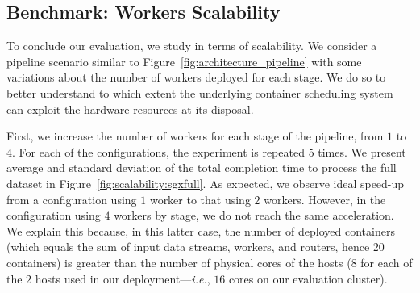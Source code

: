 




\subsection{Benchmark: Workers Scalability}
To conclude our evaluation, we study \SYS{} in terms of scalability.
We consider a pipeline scenario similar to Figure~\ref{fig:architecture_pipeline} with some variations about the number of workers deployed for each stage.
We do so to better understand to which extent the underlying container scheduling system can exploit the hardware resources at its disposal.

First, we increase the number of workers for each stage of the pipeline, from $1$ to $4$.
For each of the configurations, the experiment is repeated $5$ times.
We present average and standard deviation of the total completion time to process the full dataset in Figure~\ref{fig:scalability:sgxfull}.
As expected, we observe ideal speed-up from a configuration using $1$ worker to that using $2$ workers.
However, in the configuration using $4$ workers by stage, we do not reach the same acceleration.
We explain this because, in this latter case, the number of deployed containers (which equals the sum of input data streams, workers, and routers, hence $20$ containers) is greater than the number of physical cores of the hosts ($8$ for each of the $2$ hosts used in our deployment---\emph{i.e.}, $16$ cores on our evaluation cluster).

